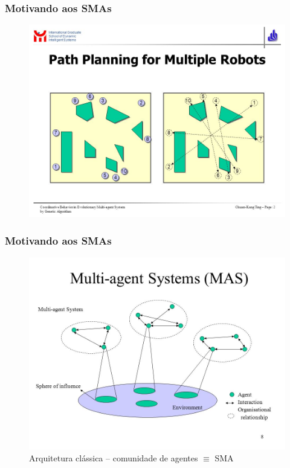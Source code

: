 
\begin{frame}
\frametitle{Motivando aos SMAs}

\begin{figure}[!ht]
\centering
\includegraphics[height =.6\textheight,width=.7\textwidth]{figuras/agentes_vizinhos02.jpeg}
\end{figure}
\end{frame}


\begin{frame}

  \frametitle{Motivando aos SMAs}

\begin{figure}[!ht]
\centering
\includegraphics[height =.6\textheight,width=.7\textwidth]{figuras/agentes_vizinhos03.jpeg}
\caption{Arquitetura clássica -- comunidade de agentes $\equiv $   SMA}
\end{figure}
 
\end{frame}



